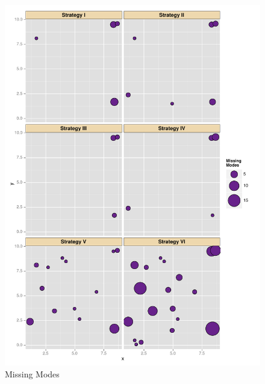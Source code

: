 \documentclass[xetex]{beamer}
\begin{document}
	\begin{frame}[plain]
	    \begin{columns} 
	    	\begin{column}[t]{.5\textwidth}	
				\begin{figure}
					\caption{Missing Modes}
					\includegraphics[height=.9\textheight, keepaspectratio]{./picts/ggplotMissingModes}
				\end{figure}	
			\end{column}


\end{columns}
\end{frame}
\end{document}
